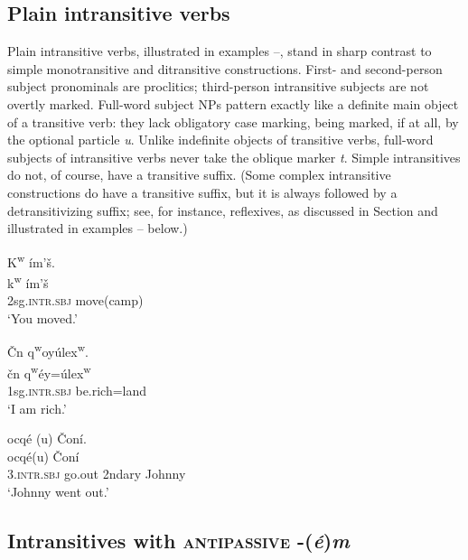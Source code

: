\documentclass[output=paper,colorlinks,citecolor=brown]{langscibook}
\begin{document}
\subsection{Plain intransitive verbs}  %
\label{thomason_section_2.3}

Plain intransitive verbs, illustrated in examples --, stand in sharp
contrast to simple monotransitive and ditransitive constructions.
First- and second-person subject pronominals are proclitics;
third-person intransitive subjects are not overtly marked.  Full-word
subject NPs pattern exactly like a definite main object of a
transitive verb: they lack obligatory case marking, being marked, if at
all, by the optional particle \emph{{\textltilde}u}.  Unlike indefinite
objects of transitive verbs, full-word subjects of intransitive verbs
never take the oblique marker \emph{t}.  Simple intransitives do not,
of course, have a transitive suffix.  (Some complex intransitive
constructions do have a transitive suffix, but it is always followed
by a detransitivizing suffix; see, for instance, reflexives, as
discussed in Section  and illustrated in examples -- below.)

\ea
\label{ex-thomason-11}
K\textsuperscript w \textglotstop\'im'\v{s}.  \\
\gll k\textsuperscript w \textglotstop\'im'\v{s}\\
2sg.\textsc{intr.sbj} move(camp)\\  
\glt `You moved.'
\z

\ea 
\label{ex-thomason-12}
\v{C}n {q\textsuperscript w}oy\'ulex\textsuperscript w.  \\
\gll \v{c}n q\textsuperscript w\'ey=\'ulex\textsuperscript w\\
1sg.\textsc{intr.sbj} be.rich=land\\  

\glt `I am rich.'
\z

\ea 
\label{ex-thomason-13}
{\textglotstop}ocq\'e{\textglotstop} ({\textltilde}u)  \v{C}on\'i. \\
  {\textglotstop}ocq\'e\textglotstop ({\textltilde}u) \v{C}on\'i\\
3.\textsc{intr.sbj}  go.out 2ndary Johnny\\
 \glt `Johnny went out.'
 \z


\subsection{Intransitives with \textsc{antipassive} -(\emph{\'e})\emph{m}}  %
\label{thomason_section_2.4}
\end{document}
